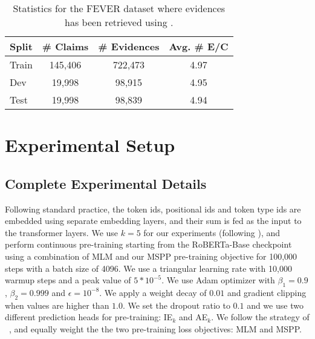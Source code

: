\begin{itemize}[wide, labelwidth=!, labelindent=0pt]
    \begin{table}[h]
    \centering
    \small
    \begin{tabular}{lccc}
    \toprule
        \textbf{Split} & \textbf{\# Claims} & \textbf{\# Evidences} & \textbf{Avg. \# E/C} \\
        \midrule
        Train   & 145,406    & 722,473 & 4.97 \\
        Dev     & 19,998     & 98,915  & 4.95 \\
        Test    & 19,998     & 98,839  & 4.94 \\ \bottomrule
    \end{tabular}
    \caption{Statistics for the FEVER dataset where evidences has been retrieved using \citep{liu2020kernel}.}
    \label{tab:fever}
    \end{table}    
\end{itemize}



\section{Experimental Setup}
\label{app:experiments}

\subsection{Complete Experimental Details}
Following standard practice, the token ids, positional ids and token type ids are embedded using separate embedding layers, and their sum is fed as the input to the transformer layers.
We use $k{=}5$ for our experiments (following \citeauthor{zhang-etal-2021-joint, tymoshenko-moschitti-2021-strong}), and perform continuous pre-training starting from the RoBERTa-Base checkpoint using a combination of MLM and our MSPP pre-training objective for 100,000 steps with a batch size of 4096. We use a triangular learning rate with 10,000 warmup steps and a peak value of $5*10^{-5}$. We use Adam optimizer with $\beta_1 = 0.9$, $\beta_2 = 0.999$ and $\epsilon = 10^{-8}$. We apply a weight decay of $0.01$ and gradient clipping when values are higher than $1.0$. We set the dropout ratio to $0.1$ and we use two different prediction heads for pre-training: IE$_k$ and AE$_k$. We follow the strategy of ~\cite{devlin2019bert,lan2020albert}, and equally weight the the two pre-training loss objectives: MLM and MSPP.

